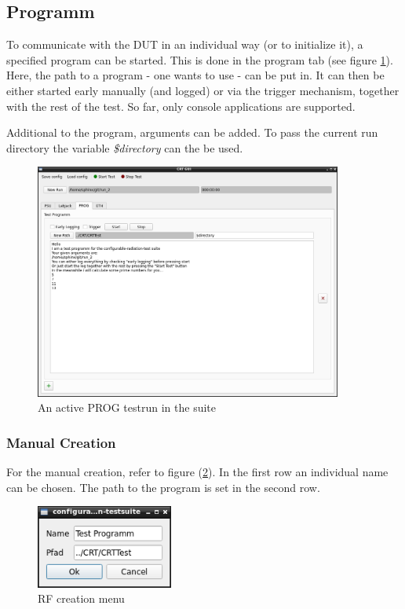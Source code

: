 \documentclass[10pt,a4paper]{article}
\begin{document}
	\newpage
	
	\subsection{Programm}
	To communicate with the DUT in an individual way (or to initialize it), a specified program can be started. This is done in the program tab (see figure \ref{f:prog_example}). Here, the path to a program - one wants to use - can be put in. It can then be either started early manually (and logged) or via the trigger mechanism, together with the rest of the test. So far, only console applications are supported.
	
	Additional to the program, arguments can be added. To pass the current run directory the variable \textit{\$directory} can the be used.
	
	\begin{figure}[H]
	\centering
	\includegraphics[width=0.9\textwidth]{./7_PROG_example.png}
	\caption{An active PROG testrun in the suite}
	\label{f:prog_example}
	\end{figure}
	
		\subsubsection{Manual Creation}	
		For the manual creation, refer to figure (\ref{f:prog_menu}). In the first row an individual name can be chosen. The path to the program is set in the second row. 
		
		\begin{figure}[H]
\centering
\includegraphics[width=0.4\textwidth]{./7_PROG_menu.png}
\caption{RF creation menu}
\label{f:prog_menu}
		\end{figure}
			
\end{document}
